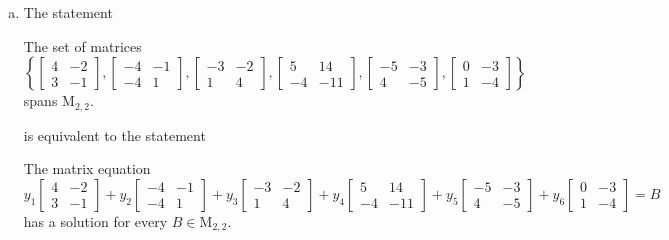 \begin{exerciseAnswer}
\begin{enumerate}[(a)]
\item The statement 
\begin{center}\begin{minipage}{0.8\textwidth}
 The set of matrices \( \left\{ \left[\begin{array}{cc}
4 & -2 \\
3 & -1
\end{array}\right] , \left[\begin{array}{cc}
-4 & -1 \\
-4 & 1
\end{array}\right] , \left[\begin{array}{cc}
-3 & -2 \\
1 & 4
\end{array}\right] , \left[\begin{array}{cc}
5 & 14 \\
-4 & -11
\end{array}\right] , \left[\begin{array}{cc}
-5 & -3 \\
4 & -5
\end{array}\right] , \left[\begin{array}{cc}
0 & -3 \\
1 & -4
\end{array}\right] \right\} \) spans \(\mathrm{M}_{2,2}\). 
\end{minipage}\end{center}
     is equivalent to the statement 
\begin{center}\begin{minipage}{0.8\textwidth}
 The matrix equation \[ y_{1} \left[\begin{array}{cc}
4 & -2 \\
3 & -1
\end{array}\right] + y_{2} \left[\begin{array}{cc}
-4 & -1 \\
-4 & 1
\end{array}\right] + y_{3} \left[\begin{array}{cc}
-3 & -2 \\
1 & 4
\end{array}\right] + y_{4} \left[\begin{array}{cc}
5 & 14 \\
-4 & -11
\end{array}\right] + y_{5} \left[\begin{array}{cc}
-5 & -3 \\
4 & -5
\end{array}\right] + y_{6} \left[\begin{array}{cc}
0 & -3 \\
1 & -4
\end{array}\right] =B\] has a solution for every \(B \in \mathrm{M}_{2,2}\). 
\end{minipage}\end{center}
    

\end{enumerate}
\end{exerciseAnswer}
